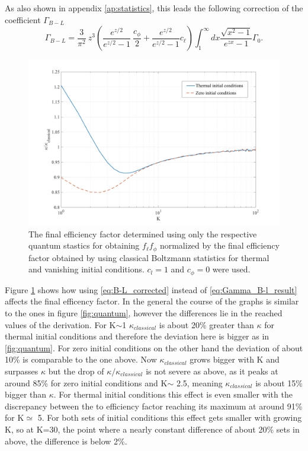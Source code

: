 As also shown in appendix \ref{ap:statistics}, this leads the following correction of the coefficient $\Gamma_{B-L}$
\begin{equation}
\Gamma_{B-L}=\frac{3}{\pi^2}\:z^3\left(\frac{e^{z/2}}{e^{z/2}-1}\:\frac{c_\phi}{2}+\frac{e^{z/2}}{e^{z/2}-1}c_\ell\right)\int_{1}^{\infty}dx\frac{\sqrt{x^2-1}}{e^{zx}-1}\Gamma_0.
\label{eq:B-L_corrected}
\end{equation}
\begin{figure}[H]
	\centering
	\includegraphics[width=\linewidth]{Images/quantum1}
	\caption{The final efficiency factor determined using only the respective quantum stastics for obtaining $f_\ell f_\phi$ normalized by the final efficiency factor obtained by using classical Boltzmann statistics for thermal and vanishing initial conditions. $c_l=1$ and $c_\phi=0$ were used.}
	\label{fig:quantum1}
\end{figure} \noindent
Figure \ref{fig:quantum1} shows how using \eqref{eq:B-L_corrected} instead of \eqref{eq:Gamma_B-l_result} affects the final efficency factor. In the general the course of the graphs is similar to the ones in figure \ref{fig:quantum}, however the differences lie in the reached values of the derivation. For K$\sim$1 $\kappa_{classical}$ is about 20\% greater than $\kappa$ for thermal initial conditions and therefore the deviation here is bigger as in \ref{fig:quantum}. For zero initial conditions on the other hand the deviation of about 10\% is comparable to the one above. Now $\kappa_{classical}$ grows bigger with K and surpasses $\kappa$ but the drop of $\kappa/\kappa_{classical}$ is not severe as above, as it peaks at around 85\% for zero initial conditions and K$\sim$ 2.5, meaning $\kappa_{classical}$ is about 15\% bigger than $\kappa$. For thermal initial conditions this effect is even smaller with the discrepancy between the to efficiency factor reaching its maximum at around 91\% for K$\simeq$ 5. For both sets of initial conditions this effect gets smaller with growing K, so at K=30, the point where a nearly constant difference of about 20\% sets in above, the difference is below 2\%. \newline \indent
